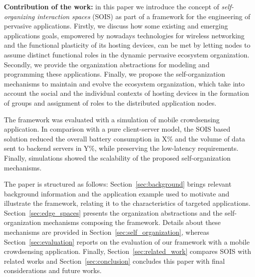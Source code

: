 \textbf{Contribution of the work:} 
in this paper we introduce the concept of \textit{self-organizing interaction spaces} (SOIS) as part of a framework for the engineering of pervasive applications. 
Firstly, we discuss how some existing and emerging applications goals, empowered by nowadays technologies for wireless networking and the functional plasticity of its hosting devices, can be met by letting nodes to assume distinct functional roles in the dynamic pervasive ecosystem organization. 
Secondly, we provide the organization abstractions for modeling and programming these applications. Finally, we propose the self-organization mechanisms to maintain and evolve the ecosystem organization, which take into account the social and the individual contexts of hosting devices in the formation of groups and assignment of roles to the  distributed application nodes.

The framework was evaluated with a simulation of mobile crowdsensing application. %
In comparison with a pure client-server model, the SOIS based solution reduced the overall battery consumption in X\% and the volume of data sent to backend servers in Y\%, while preserving the low-latency requirements. Finally, simulations showed the scalability of the proposed self-organization mechanisms.

The paper is structured as follows: Section~\ref{sec:background} brings relevant background information and the application example used to motivate and illustrate the framework, relating it to the characteristics of targeted applications. Section~\ref{sec:edge_spaces} presents the organization abstractions and the self-organization mechanisms composing the framework. Details about these mechanisms are provided in Section~\ref{sec:self_organization}, whereas Section~\ref{sec:evaluation} reports on the evaluation of our framework with a mobile crowdsensing application. Finally, Section~\ref{sec:related_work} compares SOIS with related works and Section~\ref{sec:conclusion} concludes this paper with final considerations and future works.
